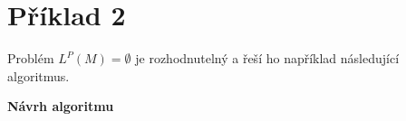 \documentclass[11pt, a4paper, titlepage]{article}
\begin{document}



\newpage


\section*{Příklad 2}

Problém $L^P(M) = \emptyset$ je rozhodnutelný a řeší ho například následující algoritmus.
\bigskip

\textbf{Návrh algoritmu}
\end{document}
